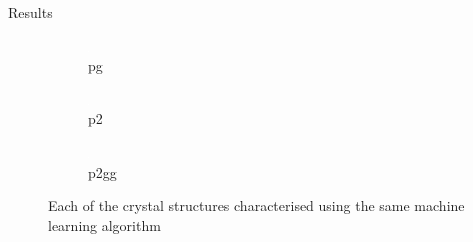 \documentclass[]{beamer}
\begin{document}
\begin{frame}[t]{}
\begin{columns}[t]
\begin{column}{0.45\linewidth}
\begin{block}{Results}
        \begin{figure}[h]
          \centering
          \begin{subfigure}[t]{\linewidth}
              \includegraphics[width=0.5\linewidth]{trimer-cat-pg}
            \caption{pg}
            \label{fig:categorised pg}
          \end{subfigure}
          \begin{subfigure}[t]{\linewidth}
              \includegraphics[width=0.5\linewidth]{trimer-cat-p2}
            \caption{p2}
            \label{fig:categorised p2}
          \end{subfigure}
          \begin{subfigure}[t]{\linewidth}
              \includegraphics[width=0.5\linewidth]{trimer-cat-p2gg}
            \caption{p2gg}
            \label{fig:categorised p2gg}
          \end{subfigure}
          \caption{Each of the crystal structures characterised using the same
          machine learning algorithm}
          \label{fig:categorised}
        \end{figure}



\end{block}
\end{column}
\end{columns}
\end{frame}
\end{document}
